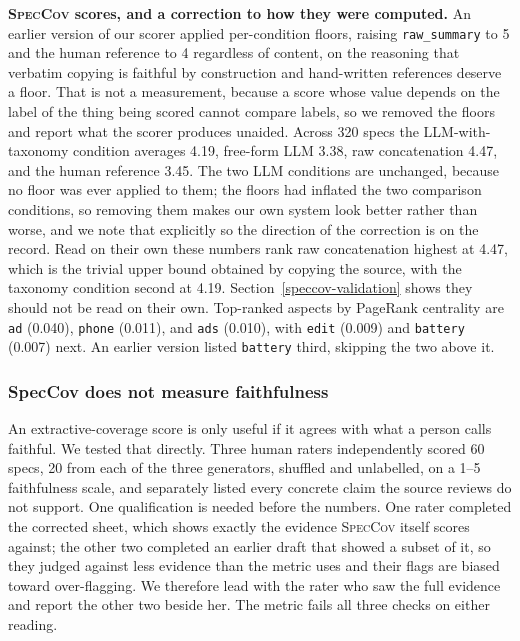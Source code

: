 \documentclass[preprint,12pt]{elsarticle}
\begin{document}
\textbf{\textsc{SpecCov} scores, and a correction to how they were computed.} An earlier
version of our scorer applied per-condition floors, raising \texttt{raw\_summary} to 5 and the
human reference to 4 regardless of content, on the reasoning that verbatim copying is faithful by
construction and hand-written references deserve a floor. That is not a measurement, because a
score whose value depends on the label of the thing being scored cannot compare labels, so we
removed the floors and report what the scorer produces unaided. Across 320 specs the
LLM-with-taxonomy condition averages 4.19, free-form LLM 3.38, raw concatenation 4.47, and the
human reference 3.45. The two LLM conditions are unchanged, because no floor was ever applied to
them; the floors had inflated the two comparison conditions, so removing them makes our own
system look better rather than worse, and we note that explicitly so the direction of the
correction is on the record. Read on their own these numbers rank raw concatenation highest at 4.47, which is the trivial
upper bound obtained by copying the source, with the taxonomy condition second at 4.19. Section~\ref{speccov-validation} shows they should not be read on their own. Top-ranked aspects by PageRank centrality are
\texttt{ad} (0.040), \texttt{phone} (0.011), and \texttt{ads} (0.010), with \texttt{edit}
(0.009) and \texttt{battery} (0.007) next. An earlier version listed \texttt{battery} third,
skipping the two above it.

\subsubsection*{SpecCov does not measure faithfulness}\label{speccov-validation}
An extractive-coverage score is only useful if it agrees with what a person calls faithful. We
tested that directly. Three human raters independently scored 60 specs, 20 from each of the
three generators, shuffled and unlabelled, on a 1--5 faithfulness scale, and separately listed
every concrete claim the source reviews do not support. One qualification is needed before the
numbers. One rater completed the corrected sheet, which shows exactly the evidence
\textsc{SpecCov} itself scores against; the other two completed an earlier draft that showed a
subset of it, so they judged against less evidence than the metric uses and their flags are
biased toward over-flagging. We therefore lead with the rater who saw the full evidence and
report the other two beside her. The metric fails all three checks on either reading.
\end{document}
